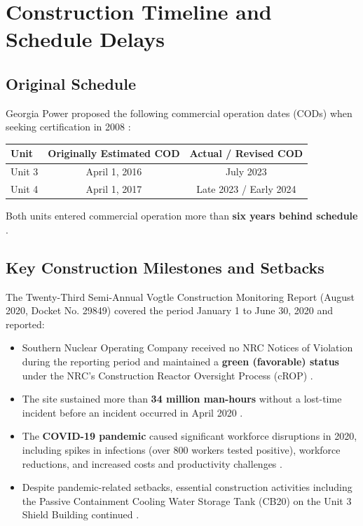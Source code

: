 \documentclass[12pt,a4paper]{article}
\begin{document}
\section{Construction Timeline and Schedule Delays}

\subsection{Original Schedule}

Georgia Power proposed the following commercial operation dates (CODs) when
seeking certification in 2008 \cite{schlissel_ieefa,gpsc_2008}:

\begin{center}
\begin{tabular}{lcc}
\toprule
\textbf{Unit} & \textbf{Originally Estimated COD} & \textbf{Actual / Revised COD} \\
\midrule
Unit 3 & April 1, 2016 & July 2023 \\
Unit 4 & April 1, 2017 & Late 2023 / Early 2024 \\
\bottomrule
\end{tabular}
\end{center}

Both units entered commercial operation more than \textbf{six years behind schedule} \cite{schlissel_ieefa}.

\subsection{Key Construction Milestones and Setbacks}

The Twenty-Third Semi-Annual Vogtle Construction Monitoring Report (August 2020,
Docket No. 29849) covered the period January 1 to June 30, 2020 and reported:

\begin{itemize}
    \item Southern Nuclear Operating Company received no NRC Notices of Violation
          during the reporting period and maintained a \textbf{green (favorable) status}
          under the NRC's Construction Reactor Oversight Process (cROP) \cite{vcm_report}.
    \item The site sustained more than \textbf{34 million man-hours} without a lost-time
          incident before an incident occurred in April 2020 \cite{vcm_report}.
    \item The \textbf{COVID-19 pandemic} caused significant workforce disruptions in
          2020, including spikes in infections (over 800 workers tested positive), workforce
          reductions, and increased costs and productivity challenges \cite{vcm_report}.
    \item Despite pandemic-related setbacks, essential construction activities including
          the Passive Containment Cooling Water Storage Tank (CB20) on the Unit 3
          Shield Building continued \cite{vcm_report}.
\end{itemize}
\end{document}
